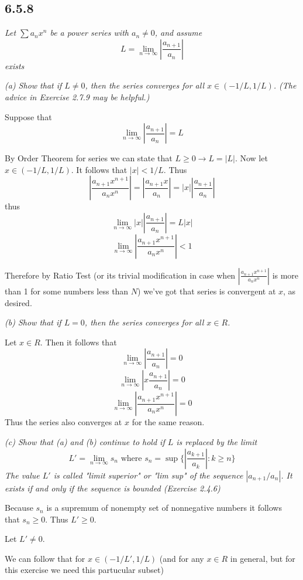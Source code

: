 \documentclass[11pt,oneside,titlepage]{book}
\begin{document}
\subsection*{6.5.8}
\textit{Let $\sum{a_n x^n}$ be a power series with $a_n \neq 0$, and assume}
$$L = \lim_{n \to \infty}{\left|\frac{a_{n + 1}}{a_n}\right|}$$
\textit{exists}

\textit{(a) Show that if $L \neq 0$, then the series converges for all
  $x \in (-1/L, 1/L)$. (The advice in Exercise 2.7.9 may be helpful.)}

Suppose that
$$\lim_{n \to \infty}{\left|\frac{a_{n + 1}}{a_n}\right|} = L$$

By Order Theorem for series we can state that $L \geq 0 \to L = |L|$.
Now let $x \in (-1/L, 1/L)$. It follows that $|x| < 1/L$. Thus
$$\left|\frac{a_{n + 1} x^{n + 1}}{a_n x^n}\right| =
\left|\frac{a_{n + 1}x}{a_n}\right| = |x| \left|\frac{a_{n + 1}}{a_n}\right|
$$
thus
$$\lim_{n \to \infty}{|x|\left|\frac{a_{n + 1}}{a_n}\right|} = L|x|$$
$$\lim_{n \to \infty}{\left|\frac{a_{n + 1} x^{n + 1}}{a_n x^n}\right|} <1$$

Therefore by Ratio Test (or its trivial modification in case when
$\left|\frac{a_{n + 1} x^{n + 1}}{a_n x^n}\right|$ is more than 1 for
some numbers less than $N$) we've got that series is convergent at $x$, as
desired.

\textit{(b) Show that if $L = 0$, then the series converges for all $x \in R$.}

Let $x \in  R$. Then it follows that 
$$\lim_{n \to \infty}{\left|\frac{a_{n + 1}}{a_n}\right|} = 0$$
$$\lim_{n \to \infty}{\left|x \frac{a_{n + 1}}{a_n}\right|} = 0$$
$$\lim_{n \to \infty}{\left|\frac{a_{n + 1} x^{n + 1}}{a_n x^n}\right|} = 0$$
Thus the series also converges at $x$ for the same reason.

\textit{(c) Show that (a) and (b) continue to hold if $L$ is replaced by the
  limit }
$$L' = \lim_{n \to \infty} s_n \text{ where } s_n =
\sup{\{\left|\frac{a_{k + 1}}{a_k}\right|: k \geq n\}}$$
\textit{The value $L'$ is called "limit superior" or "lim sup" of
  the sequence $|a_{n + 1}/a_n|$. It exists if and only if the
  sequence is bounded (Exercise 2.4.6)}


Because $s_n$ is a supremum of  nonempty set of nonnegative numbers
it follows that $s_n \geq 0$. Thus $L' \geq 0$.

Let $L' \neq 0$.

We can follow that for  $x \in (-1/L', 1/L)$ (and for any $x \in R$ in general,
but for this exercise we need this partucular subset)
\end{document}
